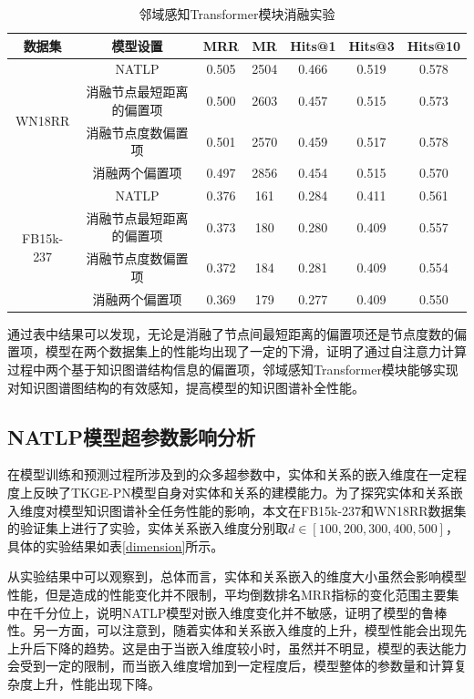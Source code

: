 \begin{table}[htbp]
  \begin{center}
      \caption{邻域感知Transformer模块消融实验}
      \setlength{\tabcolsep}{8pt}
      \renewcommand\arraystretch{1.5}
      \begin{tabular}{*{7}{c}}
          \toprule
          数据集 & 模型设置 & MRR&MR&Hits@1&Hits@3&	Hits@10\\
          \midrule
          \multirow{4}{*}{WN18RR}&NATLP&0.505&2504&0.466&0.519&0.578\\
          &消融节点最短距离的偏置项&0.500&2603&0.457&0.515&0.573\\
          &消融节点度数偏置项&0.501&2570&0.459&0.517&0.578\\
          &消融两个偏置项&0.497&2856&0.454&0.515&0.570\\
          \cmidrule{1-7}
          \multirow{4}{*}{FB15k-237}&NATLP&0.376&161&0.284&0.411&0.561\\
          &消融节点最短距离的偏置项&0.373&180&0.280&0.409&0.557\\
          &消融节点度数偏置项&0.372&184&0.281&0.409&0.554\\
          &消融两个偏置项&0.369&179&0.277&0.409&0.550\\
          \bottomrule
      \end{tabular}
      \label{NATLP_ablation2}
  \end{center}
\end{table}

通过表中结果可以发现，无论是消融了节点间最短距离的偏置项还是节点度数的偏置项，模型在两个数据集上的性能均出现了一定的下滑，证明了通过自注意力计算过程中两个基于知识图谱结构信息的偏置项，邻域感知Transformer模块能够实现对知识图谱图结构的有效感知，提高模型的知识图谱补全性能。

\subsection{NATLP模型超参数影响分析}

在模型训练和预测过程所涉及到的众多超参数中，实体和关系的嵌入维度在一定程度上反映了TKGE-PN模型自身对实体和关系的建模能力。为了探究实体和关系嵌入维度对模型知识图谱补全任务性能的影响，本文在FB15k-237和WN18RR数据集的验证集上进行了实验，实体关系嵌入维度分别取$d \in \left[100,200,300,400,500\right] $，具体的实验结果如表\ref{dimension}所示。



从实验结果中可以观察到，总体而言，实体和关系嵌入的维度大小虽然会影响模型性能，但是造成的性能变化并不限制，平均倒数排名MRR指标的变化范围主要集中在千分位上，说明NATLP模型对嵌入维度变化并不敏感，证明了模型的鲁棒性。另一方面，可以注意到，随着实体和关系嵌入维度的上升，模型性能会出现先上升后下降的趋势。这是由于当嵌入维度较小时，虽然并不明显，模型的表达能力会受到一定的限制，而当嵌入维度增加到一定程度后，模型整体的参数量和计算复杂度上升，性能出现下降。



